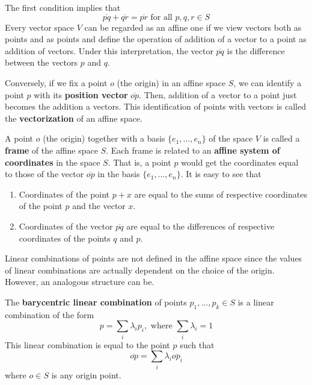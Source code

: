   The first condition implies that
  \begin{equation}
    \overline{pq} + \overline{qr} = \overline{pr} \text{ for all } p, q, r \in S
  \end{equation}
  Every vector space $V$ can be regarded as an affine one if we view vectors both as points and as points and define the operation of addition of a vector to a point as addition of vectors. Under this interpretation, the vector $\overline{pq}$ is the difference between the vectors $p$ and $q$. 

  \begin{definition}
    Conversely, if we fix a point $o$ (the origin) in an affine space $S$, we can identify a point $p$ with its \textbf{position vector} $\overline{op}$. Then, addition of a vector to a point just becomes the addition a vectors. This identification of points with vectors is called the \textbf{vectorization} of an affine space. 
  \end{definition}

  \begin{definition}
    A point $o$ (the origin) together with a basis $\{e_1, ..., e_n\}$ of the space $V$ is called a \textbf{frame} of the affine space $S$. Each frame is related to an \textbf{affine system of coordinates} in the space $S$. That is, a point $p$ would get the coordinates equal to those of the vector $\overline{op}$ in the basis $\{e_1, ..., e_n\}$. It is easy to see that 
    \begin{enumerate}
      \item Coordinates of the point $p+x$ are equal to the sums of respective coordinates of the point $p$ and the vector $x$. 
      \item Coordinates of the vector $\overline{pq}$ are equal to the differences of respective coordinates of the points $q$ and $p$. 
    \end{enumerate}
  \end{definition}

  Linear combinations of points are not defined in the affine space since the values of linear combinations are actually dependent on the choice of the origin. However, an analogous structure can be. 

  \begin{definition}
    The \textbf{barycentric linear combination} of points $p_1, ..., p_k \in S$ is a linear combination of the form
    \begin{equation}
      p = \sum_i \lambda_i p_i, \text{ where } \sum_i \lambda_i = 1
    \end{equation}
    This linear combination is equal to the point $p$ such that
    \begin{equation}
      \overline{op} = \sum_i \lambda_i \overline{op_i}
    \end{equation}
    where $o \in S$ is any origin point.
  \end{definition}

